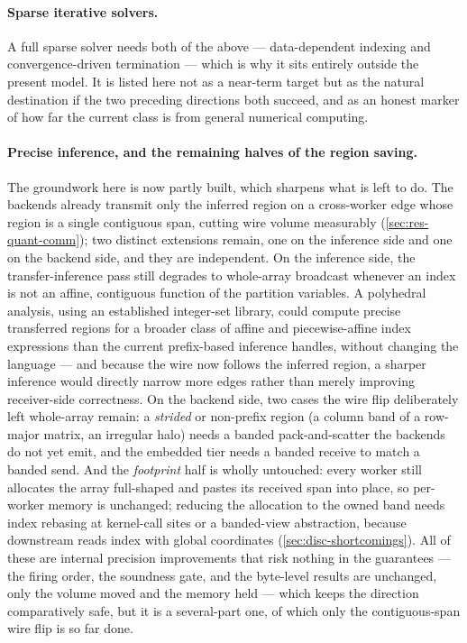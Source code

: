 \paragraph{Sparse iterative solvers.} A full sparse solver needs both of the
above --- data-dependent indexing and convergence-driven termination --- which is
why it sits entirely outside the present model. It is listed here not as a
near-term target but as the natural destination if the two preceding directions
both succeed, and as an honest marker of how far the current class is from
general numerical computing.

\paragraph{Precise inference, and the remaining halves of the region saving.} The
groundwork here is now partly built, which sharpens what is left to do. The backends
already transmit only the inferred region on a cross-worker edge whose region is a
single contiguous span, cutting wire volume measurably (\cref{sec:res-quant-comm}); two
distinct extensions remain, one on the inference side and one on the backend side, and
they are independent. On the inference side, the transfer-inference pass still degrades
to whole-array broadcast whenever an index is not an affine, contiguous function of the
partition variables. A polyhedral analysis, using an established integer-set library,
could compute precise transferred regions for a broader class of affine and
piecewise-affine index expressions than the current prefix-based inference handles,
without changing the language --- and because the wire now follows the inferred region,
a sharper inference would directly narrow more edges rather than merely improving
receiver-side correctness. On the backend side, two cases the wire flip deliberately
left whole-array remain: a \emph{strided} or non-prefix region (a column band of a
row-major matrix, an irregular halo) needs a banded pack-and-scatter the backends do not
yet emit, and the embedded tier needs a banded receive to match a banded send. And the
\emph{footprint} half is wholly untouched: every worker still allocates the array
full-shaped and pastes its received span into place, so per-worker memory is unchanged;
reducing the allocation to the owned band needs index rebasing at kernel-call sites or a
banded-view abstraction, because downstream reads index with global coordinates
(\cref{sec:disc-shortcomings}). All of these are internal precision improvements that
risk nothing in the guarantees --- the firing order, the soundness gate, and the
byte-level results are unchanged, only the volume moved and the memory held --- which
keeps the direction comparatively safe, but it is a several-part one, of which only the
contiguous-span wire flip is so far done.

